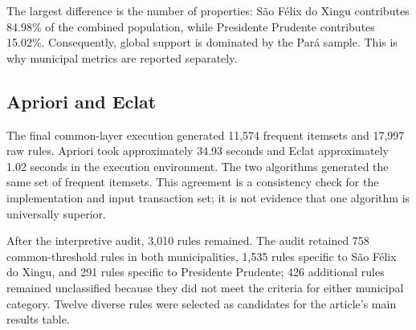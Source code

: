 \documentclass[11pt]{article}
\begin{document}
The largest difference is the number of properties: São Félix do Xingu contributes 84.98\% of the combined population, while Presidente Prudente contributes 15.02\%. Consequently, global support is dominated by the Pará sample. This is why municipal metrics are reported separately.

\subsection{Apriori and Eclat}

The final common-layer execution generated 11,574 frequent itemsets and 17,997 raw rules. Apriori took approximately 34.93 seconds and Eclat approximately 1.02 seconds in the execution environment. The two algorithms generated the same set of frequent itemsets. This agreement is a consistency check for the implementation and input transaction set; it is not evidence that one algorithm is universally superior.

After the interpretive audit, 3,010 rules remained. The audit retained 758 common-threshold rules in both municipalities, 1,535 rules specific to São Félix do Xingu, and 291 rules specific to Presidente Prudente; 426 additional rules remained unclassified because they did not meet the criteria for either municipal category. Twelve diverse rules were selected as candidates for the article's main results table.
\end{document}
